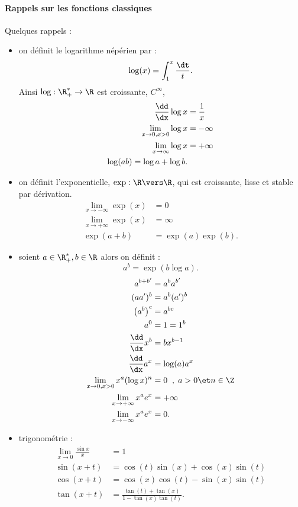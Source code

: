 \paragraph{Rappels sur les fonctions classiques}Quelques rappels :
\begin{itemize}
\item on définit le logarithme népérien par : \[ \log(x) = \int_{1}^{x}\frac{\dt}{t}.\]Ainsi $\log : \R^{*}_{+} \to \R$ est croissante, $C^{\infty}$, 
\begin{align*}
\frac{\dd}{\dx}\log x &= \frac{1}{x}\\
\lim_{x\to 0, x>0} \log x &= -\infty \\
\lim_{x\to \infty} \log x &= +\infty \\
\log(ab) = \log a + \log b.
\end{align*}
\item on définit l'exponentielle, $\exp : \R \vers \R$, qui est croissante, lisse et stable par dérivation.
\begin{align*}
\lim_{x\to -\infty}\exp(x) &= 0 \\
\lim_{x\to + \infty} \exp(x) &= \infty\\
\exp(a+b) &= \exp(a)\exp(b).
\end{align*}
\item soient $a\in \R_+^{*}, b\in \R$ alors on définit : \[ a^{b} = \exp(b\log a).\]
\begin{align*}
a^{b+b'} &= a^{b}a^{b'} \\
(aa')^{b} &= a^{b} (a')^{b} \\
\left(a^{b}\right)^{c} &= a^{bc}\\
a^{0} &= 1 = 1^{b}\\
\frac{\dd }{\dx}x^{b} &= bx^{b-1} \\
\frac{\dd }{\dx}a^{x} &= \log (a)a^{x} \\
\lim_{x\to 0, x >0} x^{a}(\log x)^{n} &= 0\; \; ,\; a >0 \et n\in \Z \\
\lim_{x\to+\infty} x^{a} e^{x} &= +\infty \\
\lim_{x\to -\infty} x^{a}e^{x} &= 0.
\end{align*}
\item trigonométrie :
\begin{align*}
\lim_{x\to 0}\frac{\sin x}{x} &= 1 \\
\sin(x+t) &= \cos(t)\sin(x) + \cos(x)\sin(t) \\
\cos(x+t) &= \cos(x)\cos(t) - \sin(x)\sin(t)\\
\tan(x+t) &= \frac{\tan(t) + \tan(x)}{1 - \tan(x)\tan(t)}.

\end{align*}
\end{itemize}
